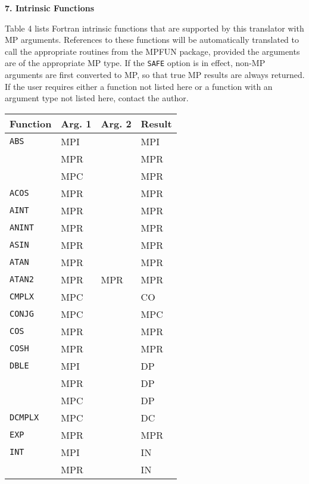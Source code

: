\vspace{2ex} \noindent
{\bf 7. Intrinsic Functions}
 
Table 4 lists Fortran intrinsic functions that are supported by this
translator with MP arguments.  References to these functions will be
automatically translated to call the appropriate routines from the
MPFUN package, provided the arguments are of the appropriate MP type.
If the {\tt SAFE} option is in effect, non-MP arguments are first
converted to MP, so that true MP results are always returned.  If the
user requires either a function not listed here or a function with an
argument type not listed here, contact the author.
 
\begin{table} \begin{center} \begin{small} \begin{tabular}{|l|l|l|l|}
\hline
   Function &  Arg. 1 &   Arg. 2 &   Result \\
\hline
{\tt ABS}   &    MPI   &      &    MPI \\
            &    MPR   &      &    MPR \\
            &    MPC   &      &    MPR \\
{\tt ACOS}  &    MPR   &      &    MPR \\
{\tt AINT}  &    MPR   &      &    MPR \\
{\tt ANINT} &    MPR   &      &    MPR \\
{\tt ASIN}  &    MPR   &      &    MPR \\
{\tt ATAN}  &    MPR   &      &    MPR \\
{\tt ATAN2} &    MPR   &  MPR &    MPR \\
{\tt CMPLX} &    MPC   &      &    CO \\
{\tt CONJG} &    MPC   &      &    MPC \\
{\tt COS}   &    MPR   &      &    MPR \\
{\tt COSH}  &    MPR   &      &    MPR \\
{\tt DBLE}  &    MPI   &      &    DP \\
            &    MPR   &      &    DP \\
            &    MPC   &      &    DP \\
{\tt DCMPLX}&    MPC   &      &    DC \\
{\tt EXP}   &    MPR   &      &    MPR \\
{\tt INT}   &    MPI   &      &    IN \\
            &    MPR   &      &    IN \\

\end{tabular}
\end{small}
\end{center}
\end{table}
